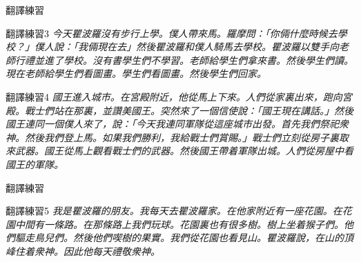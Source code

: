 \documentclass[aspectratio=169]{beamer}
\begin{document}
\begin{frame}{翻譯練習}
    \begin{block}{翻譯練習3}
        \rmfamily\itshape
        今天瞿波羅沒有步行上學。僕人帶來馬。羅摩問：「你倆什麼時候去學校？」僕人說：「我倆現在去」然後瞿波羅和僕人騎馬去學校。瞿波羅以雙手向老師行禮並進了學校。沒有書學生們不學習。老師給學生們拿來書。然後學生們讀。現在老師給學生們看圖畫。學生們看圖畫。然後學生們回家。
    \end{block}

    \begin{block}{翻譯練習4}
        \rmfamily\itshape
        國王進入城市。在宮殿附近，他從馬上下來。人們從家裏出來，跑向宮殿。戰士們站在那裏，並讚美國王。突然來了一個信使說：「國王現在講話。」然後國王連同一個僕人來了，說：「今天我連同軍隊從這座城市出發。首先我們祭祀衆神。然後我們登上馬。如果我們勝利，我給戰士們賞賜。」戰士們立刻從房子裏取來武器。國王從馬上觀看戰士們的武器。然後國王帶着軍隊出城。人們從房屋中看國王的軍隊。
    \end{block}
\end{frame}

\begin{frame}{翻譯練習}
    \begin{block}{翻譯練習5}
        \rmfamily\itshape
        我是瞿波羅的朋友。我每天去瞿波羅家。在他家附近有一座花園。在花園中間有一條路。在那條路上我們玩球。花園裏也有很多樹。樹上坐着猴子們。他們驅走鳥兒們。然後他們喫樹的果實。我們從花園也看見山。瞿波羅說，在山的頂峰住着衆神。因此他每天禮敬衆神。
    \end{block}
\end{frame}
\end{document}
